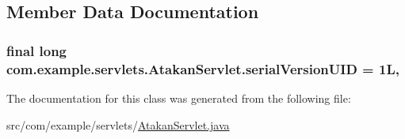 \subsection{Member Data Documentation}
\subsubsection[{\texorpdfstring{serial\+Version\+U\+ID}{serialVersionUID}}]{\setlength{\rightskip}{0pt plus 5cm}final long com.\+example.\+servlets.\+Atakan\+Servlet.\+serial\+Version\+U\+ID = 1L\hspace{0.3cm}{\ttfamily [static]}, {\ttfamily [private]}}\hypertarget{classcom_1_1example_1_1servlets_1_1_atakan_servlet_a11981eeac794fddff011e967e18e28fb}{}\label{classcom_1_1example_1_1servlets_1_1_atakan_servlet_a11981eeac794fddff011e967e18e28fb}


The documentation for this class was generated from the following file\+:\begin{DoxyCompactItemize}
\item 
src/com/example/servlets/\hyperlink{_atakan_servlet_8java}{Atakan\+Servlet.\+java}\end{DoxyCompactItemize}
